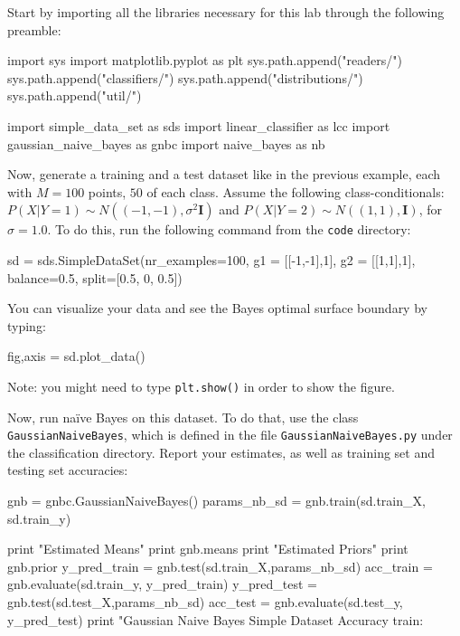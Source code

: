 \begin{exercise}\label{exer:simplenb}

\begin{enumerate}
Start by importing all the libraries necessary for this lab through the following preamble: 
\begin{python}
import sys
import matplotlib.pyplot as plt
sys.path.append("readers/")
sys.path.append("classifiers/")
sys.path.append("distributions/")
sys.path.append("util/")

import simple_data_set as sds
import linear_classifier as lcc
import gaussian_naive_bayes as gnbc
import naive_bayes as nb
\end{python}

Now, generate a training and a test dataset like in the previous example, each with $M=100$ points, $50$ of each class. 
Assume the following class-conditionals: 
$P(X|Y=1) \sim N((-1,-1), \sigma^2 \boldsymbol{I})$ and $P(X|Y=2) \sim
N((1,1), \boldsymbol{I})$, for $\sigma = 1.0$. 
To do this, run the following command from the {\tt code} directory:

\begin{python}
sd = sds.SimpleDataSet(nr_examples=100, g1 = [[-1,-1],1], g2 = [[1,1],1], balance=0.5, split=[0.5, 0, 0.5])
\end{python}

You can visualize your data and see the Bayes optimal surface boundary by typing: 
\begin{python}
fig,axis = sd.plot_data()
\end{python}

Note: you might need to type {\tt plt.show()} in order to show the figure.

Now, run na\"ive Bayes on this dataset. To do that, use the class {\tt GaussianNaiveBayes}, 
which is defined in the file {\tt GaussianNaiveBayes.py} under the
classification directory. 
Report your estimates, as well as training set and testing set
accuracies:

\begin{python}
gnb = gnbc.GaussianNaiveBayes()
params_nb_sd = gnb.train(sd.train_X, sd.train_y)

print "Estimated Means"
print gnb.means
print "Estimated Priors"
print gnb.prior
y_pred_train = gnb.test(sd.train_X,params_nb_sd)
acc_train = gnb.evaluate(sd.train_y, y_pred_train)
y_pred_test = gnb.test(sd.test_X,params_nb_sd)
acc_test = gnb.evaluate(sd.test_y, y_pred_test)
print "Gaussian Naive Bayes Simple Dataset Accuracy train: %
\end{python}


\end{enumerate}
\end{exercise}
